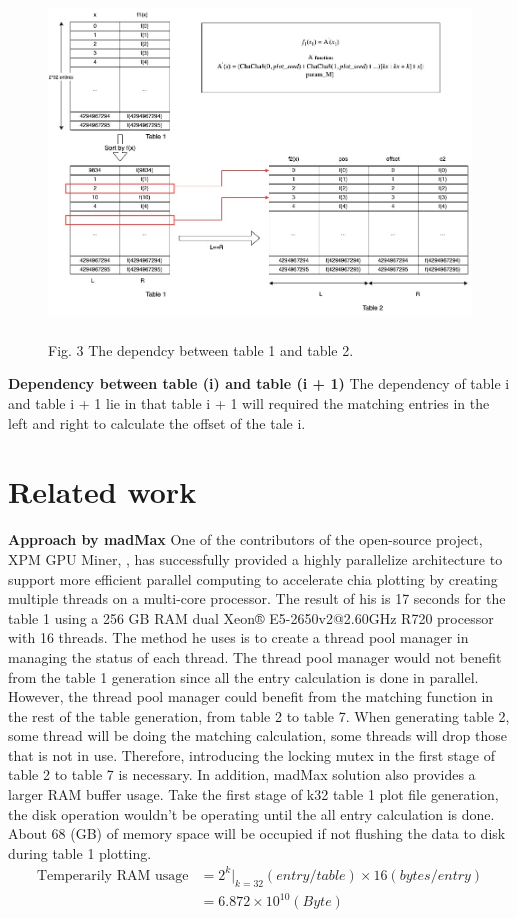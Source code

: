 \documentclass[sigconf, nonacm, natbib=false]{acmart}
\begin{document}
\begin{figure}[ht]
  \begin{center}
  \includegraphics[height=8.5cm, width=16cm]{Chia_Plot_Process.jpeg}
  \end{center}
  {\footnotesize Fig. 3 The dependcy between table 1 and table 2.}
  \end{figure}
{\bf Dependency between table (i) and table (i + 1)}
The dependency of table i and table i + 1 lie in that table i + 1 will required the matching entries in the left and right to calculate the offset of the tale i. 
\section{Related work}
{\bf Approach by madMax}
One of the contributors of the open-source project, XPM GPU Miner, \parencite[]{mad_chia_plotter}, has successfully provided a highly parallelize architecture to support more efficient parallel computing to accelerate chia plotting by creating multiple threads on a multi-core processor. The result of his is 17 seconds for the table 1 using a 256 GB RAM dual Xeon® E5-2650v2@2.60GHz R720 processor with 16 threads. The method he uses is to create a thread pool manager in managing the status of each thread. The thread pool manager would not benefit from the table 1 generation since all the entry calculation is done in parallel. However, the thread pool manager could benefit from the matching function in the rest of the table generation, from table 2 to table 7. When generating table 2, some thread will be doing the matching calculation, some threads will drop those that is not in use. Therefore, introducing the locking mutex in the first stage of table 2 to table 7 is necessary. In addition, madMax solution also provides a larger RAM buffer usage. Take the first stage of k32 table 1 plot file generation, the disk operation wouldn't be operating until the all entry calculation is done. About 68 (GB) of memory space will be occupied if not flushing the data to disk during table 1 plotting.
\begin{align*}
  \text{Temperarily RAM usage} &= 2^{k} |_{k = 32} (entry/table) \times 16 (bytes/entry) \\
                               &= 6.872 \times 10^{10} (Byte)
\end{align*}
\end{document}
